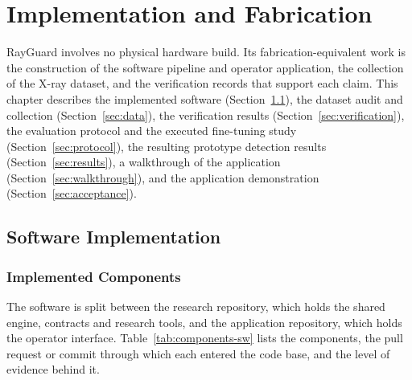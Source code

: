 \chapter{Implementation and Fabrication}\label{ch:implementation}
RayGuard involves no physical hardware build. Its fabrication-equivalent work is
the construction of the software pipeline and operator application, the
collection of the X-ray dataset, and the verification records that support each
claim. This chapter describes the implemented software (Section~\ref{sec:software}),
the dataset audit and collection (Section~\ref{sec:data}), the verification
results (Section~\ref{sec:verification}), the evaluation protocol and the executed
fine-tuning study (Section~\ref{sec:protocol}), the resulting prototype detection
results (Section~\ref{sec:results}), a walkthrough of the application
(Section~\ref{sec:walkthrough}), and the application demonstration
(Section~\ref{sec:acceptance}).

\section{Software Implementation}\label{sec:software}

\subsection{Implemented Components}
The software is split between the research repository, which holds the shared
engine, contracts and research tools, and the application repository, which holds
the operator interface. Table~\ref{tab:components-sw} lists the components, the
pull request or commit through which each entered the code base, and the level of
evidence behind it.

